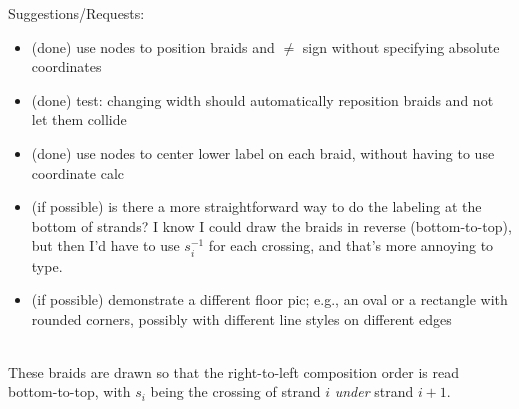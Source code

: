 \documentclass{article}
\begin{document}
Suggestions/Requests:
\begin{itemize}
\item (done) use nodes to position braids and $\not =$ sign without specifying absolute coordinates
\item (done) test: changing width should automatically reposition braids and not let them collide
\item (done) use nodes to center lower label on each braid, without having to use coordinate calc
\item (if possible) is there a more straightforward way to do the labeling at the bottom of strands?  I know I could draw the braids in reverse (bottom-to-top), but then I'd have to use $s^{-1}_i$ for each crossing, and that's more annoying to type. 
\item (if possible) demonstrate a different floor pic; e.g., an oval or a rectangle with rounded corners, possibly with different line styles on different edges
\end{itemize}
\ \\

These braids are drawn so that the right-to-left composition order is read bottom-to-top, with $s_i$ being the crossing of strand $i$ \emph{under} strand $i+1$.
\\

\end{document}
